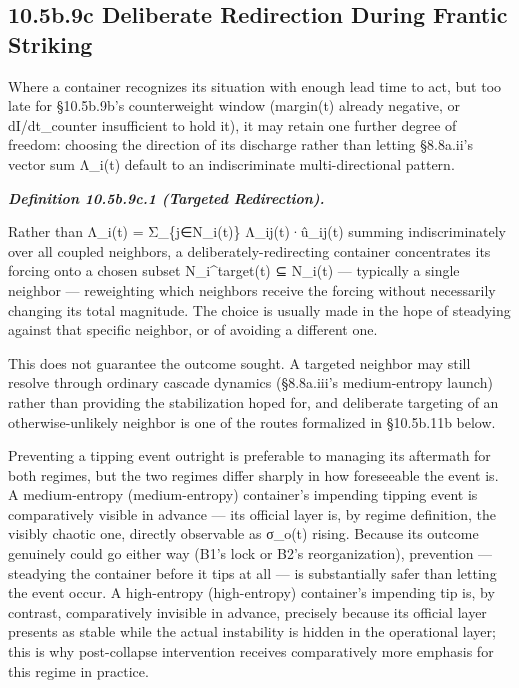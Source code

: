 \documentclass[
]{article}
\begin{document}
\hypertarget{b.9c-deliberate-redirection-during-frantic-striking}{%
\subsection{10.5b.9c Deliberate Redirection During Frantic
Striking}\label{b.9c-deliberate-redirection-during-frantic-striking}}

Where a container recognizes its situation with enough lead time to act,
but too late for §10.5b.9b's counterweight window (margin(t) already
negative, or dI/dt\textbar\_counter insufficient to hold it), it may
retain one further degree of freedom: choosing the direction of its
discharge rather than letting §8.8a.ii's vector sum ⃗Λ\_i(t) default to
an indiscriminate multi-directional pattern.

\emph{\textbf{Definition 10.5b.9c.1 (Targeted Redirection).}}

Rather than ⃗Λ\_i(t) = Σ\_\{j∈N\_i(t)\} Λ\_ij(t)·û\_ij(t) summing
indiscriminately over all coupled neighbors, a deliberately-redirecting
container concentrates its forcing onto a chosen subset
N\_i\^{}target(t) ⊆ N\_i(t) --- typically a single neighbor ---
reweighting which neighbors receive the forcing without necessarily
changing its total magnitude. The choice is usually made in the hope of
steadying against that specific neighbor, or of avoiding a different
one.

This does not guarantee the outcome sought. A targeted neighbor may
still resolve through ordinary cascade dynamics (§8.8a.iii's
medium-entropy launch) rather than providing the stabilization hoped
for, and deliberate targeting of an otherwise-unlikely neighbor is one
of the routes formalized in §10.5b.11b below.

Preventing a tipping event outright is preferable to managing its
aftermath for both regimes, but the two regimes differ sharply in how
foreseeable the event is. A medium-entropy (medium-entropy) container's
impending tipping event is comparatively visible in advance --- its
official layer is, by regime definition, the visibly chaotic one,
directly observable as σ\_o(t) rising. Because its outcome genuinely
could go either way (B1's lock or B2's reorganization), prevention ---
steadying the container before it tips at all --- is substantially safer
than letting the event occur. A high-entropy (high-entropy) container's
impending tip is, by contrast, comparatively invisible in advance,
precisely because its official layer presents as stable while the actual
instability is hidden in the operational layer; this is why
post-collapse intervention receives comparatively more emphasis for this
regime in practice.
\end{document}
